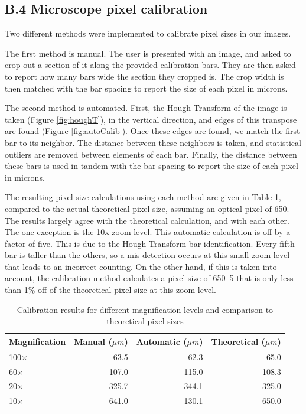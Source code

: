 \documentclass{article}
\begin{document}
\subsection*{B.4 Microscope pixel calibration}
 
Two different methods were implemented to calibrate pixel sizes in our images.

The first method is manual. The user is presented with an image, and asked to crop out a section of it along the provided calibration bars. They are then asked to report how many bars wide the section they cropped is. The crop width is then matched with the bar spacing to report the size of each pixel in microns.

The second method is automated. First, the Hough Transform of the image is taken (Figure \ref{fig:houghT}), in the vertical direction, and edges of this transpose are found (Figure \ref{fig:autoCalib}). Once these edges are found, we match the first bar to its neighbor. The distance between these neighbors is taken, and statistical outliers are removed between elements of each bar. Finally, the distance between these bars is used in tandem with the bar spacing to report the size of each pixel in microns. 

The resulting pixel size calculations using each method are given in Table \ref{tab:calib}, compared to the actual theoretical pixel size, assuming an optical pixel of \unit{650}{\nano\meter}. The results largely agree with the theoretical calculation, and with each other. The one exception is the 10x zoom level. This automatic calculation is off by a factor of five. This is due to the Hough Transform bar identification. Every fifth bar is taller than the others, so a mis-detection occurs at this small zoom level that leads to an incorrect counting. On the other hand, if this is taken into account, the calibration method calculates a pixel size of \unit{650.5}{\nano\meter} that is only less than 1\% off of the theoretical pixel size at this zoom level.

\begin{table}
\centering
\begin{tabular}{l || r | r || r}
     Magnification & Manual ($\mu m$) & Automatic ($\mu m$) & Theoretical ($\mu m$) \\
     \hline\hline
     100$\times$                & 63.5            & 62.3               & 65.0 \\ \hline
     60$\times$                 & 107.0           & 115.0              & 108.3 \\ \hline
     20$\times$                 & 325.7           & 344.1              & 325.0 \\ \hline
     10$\times$                 & 641.0           & 130.1              & 650.0 
\end{tabular}
\caption{Calibration results for different magnification levels and comparison to theoretical pixel sizes}
\label{tab:calib}
\end{table}
\end{document}
